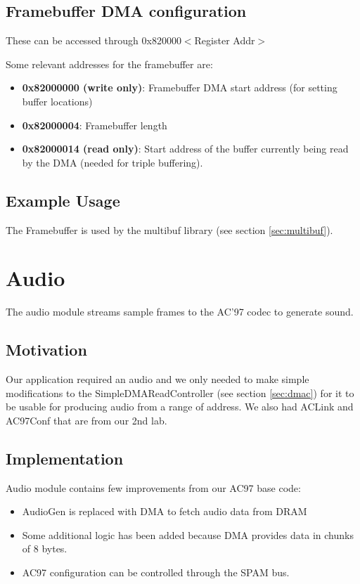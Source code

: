 \documentclass[10pt]{article}
\begin{document}
\subsection{Framebuffer DMA configuration}

These can be accessed through 0x820000$<$Register Addr$>$

Some relevant addresses for the framebuffer are:

\begin{itemize}
\item{\textbf{0x82000000 (write only)}: Framebuffer DMA start address (for setting buffer
locations)}
\item{\textbf{0x82000004}: Framebuffer length}
\item{\textbf{0x82000014 (read only)}: Start address of the buffer currently being read by
the DMA (needed for triple buffering).}
\end{itemize}

\subsection{Example Usage}

The Framebuffer is used by the multibuf library (see section
\ref{sec:multibuf}).

\section{Audio}

\label{sec:audio}

The audio module streams sample frames to the AC'97 codec to generate sound.

\subsection{Motivation}

Our application required an audio and we only needed to make simple
modifications to the SimpleDMAReadController (see section \ref{sec:dmac})
for it to be usable for producing audio from a range of address.  We also
had ACLink and AC97Conf that are from our 2nd lab.

\subsection{Implementation}

Audio module contains few improvements from our AC97 base code:

\begin{itemize}
\item{AudioGen is replaced with DMA to fetch audio data from DRAM}
\item{Some additional logic has been added because DMA provides data in
chunks of 8 bytes.}
\item{AC97 configuration can be controlled through the SPAM bus.}
\end{itemize}
\end{document}
